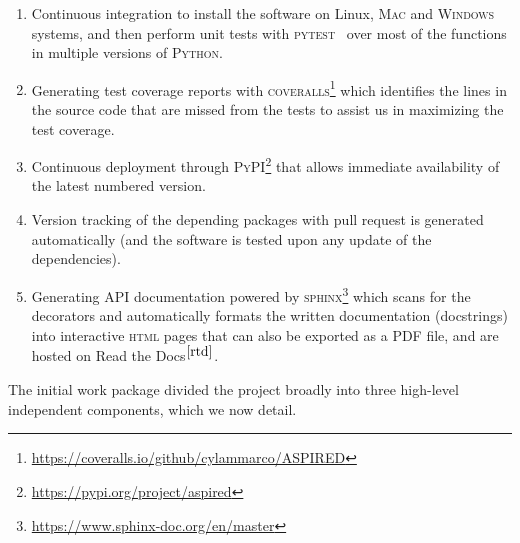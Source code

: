 \documentclass[linenumbers, twocolumn]{aastex631}
\begin{document}
\begin{enumerate}
    \item Continuous integration to install the software on Linux,
    \textsc{Mac} and \textsc{Windows} systems, and then perform unit tests with
    \textsc{pytest}~\citep{pytest6.2} over most of the functions in multiple
    versions of \textsc{Python}.
    \item Generating test coverage reports with \textsc{coveralls}\footnote{\url{    https://coveralls.io/github/cylammarco/ASPIRED}} which identifies the lines in
    the source code that are missed from the tests to assist us in maximizing the test coverage.
    \item Continuous deployment through \textsc{PyPI}\footnote{\url{https://pypi.org/project/aspired}} that allows immediate availability of the
    latest numbered version.
    \item Version tracking of the depending packages with 
    pull request is generated automatically (and the software is
    tested upon any update of the dependencies).
    \item Generating API documentation powered by \textsc{sphinx}\footnote{\url{https://www.sphinx-doc.org/en/master}} which scans for the decorators
    and automatically formats the written documentation (docstrings) into
    interactive \textsc{html} pages that can also be exported as a PDF file, and are
    hosted on Read the Docs$^{\ref{rtd}}$.
\end{enumerate}

The initial work package divided the project broadly into three high-level
independent components, which we now detail.

\end{document}

